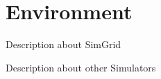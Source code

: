 \chapter{Environment}
\label{chapter:environment}
Description about SimGrid

Description about other Simulators